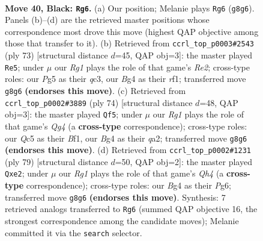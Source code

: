 \documentclass[11pt]{article}
\begin{document}
\clearpage

\begin{figure}[p]\centering
\begin{subfigure}{0.46\textwidth}\centering
\resizebox{\linewidth}{!}{%
\newchessgame
\chessboard[
  setfen={5kr1/p4p2/7p/2q1p1p1/P5b1/1K6/8/8 b - - 1 40},
  showmover=false,
  pgfstyle=straightmove, color=movearrow, markmove={g8-g6}
]}
\caption{}
\end{subfigure}\hfill
\begin{subfigure}{0.46\textwidth}\centering
\resizebox{\linewidth}{!}{%
\newchessgame
\chessboard[
  setfen={8/3kr2p/p2q2p1/1p6/8/2Q4P/P5P1/5R1K b - - 5 37},
  showmover=false,
  pgfstyle=straightmove, color=movearrow, markmove={e7-e5}
]}
\caption{}
\end{subfigure}
\\[4pt]
\begin{subfigure}{0.46\textwidth}\centering
\resizebox{\linewidth}{!}{%
\newchessgame
\chessboard[
  setfen={8/p3b3/2p4k/8/4P1Q1/6PK/q7/5B2 w - - 2 38},
  showmover=false,
  pgfstyle=straightmove, color=movearrow, markmove={g4-f5}
]}
\caption{}
\end{subfigure}\hfill
\begin{subfigure}{0.46\textwidth}\centering
\resizebox{\linewidth}{!}{%
\newchessgame
\chessboard[
  setfen={8/7p/6pk/p6q/3Q4/6P1/4PP2/6K1 b - - 1 40},
  showmover=false,
  pgfstyle=straightmove, color=movearrow, markmove={h5-e2}
]}
\caption{}
\end{subfigure}
\caption{\textbf{Move 40, Black: \texttt{Rg6}.} (a) Our position; Melanie plays \texttt{Rg6} (\texttt{g8g6}). Panels (b)--(d) are the retrieved master positions whose correspondence most drove this move (highest QAP objective among those that transfer to it). (b) Retrieved from \texttt{ccrl\_top\_p0003\#2543} (ply 73) [structural distance $d$=45, QAP obj=3]: the master played \texttt{Re5}; under $\mu$ our \emph{Rg1} plays the role of that game's \emph{Re2}; cross-type roles: our \emph{P}g5 as their \emph{q}c3, our \emph{B}g4 as their \emph{r}f1; transferred move \texttt{g8g6} \textbf{(endorses this move)}. (c) Retrieved from \texttt{ccrl\_top\_p0002\#3889} (ply 74) [structural distance $d$=48, QAP obj=3]: the master played \texttt{Qf5}; under $\mu$ our \emph{Rg1} plays the role of that game's \emph{Qg4} (a \textbf{cross-type} correspondence); cross-type roles: our \emph{Q}c5 as their \emph{B}f1, our \emph{B}g4 as their \emph{q}a2; transferred move \texttt{g8g6} \textbf{(endorses this move)}. (d) Retrieved from \texttt{ccrl\_top\_p0002\#1231} (ply 79) [structural distance $d$=50, QAP obj=2]: the master played \texttt{Qxe2}; under $\mu$ our \emph{Rg1} plays the role of that game's \emph{Qh4} (a \textbf{cross-type} correspondence); cross-type roles: our \emph{B}g4 as their \emph{P}g6; transferred move \texttt{g8g6} \textbf{(endorses this move)}. Synthesis: 7 retrieved analogs transferred to \texttt{Rg6} (summed QAP objective 16, the strongest correspondence among the candidate moves); Melanie committed it via the \texttt{search} selector.}
\label{fig:thought-m79}
\end{figure}
\end{document}
